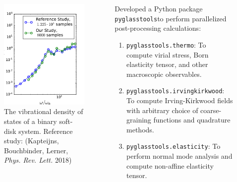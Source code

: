 \begin{frame}[c]
\begin{columns}[c]
\begin{column}{0.5\textwidth}
\begin{figure}
\begin{overprint}
\centering\includegraphics[height=0.7\textheight]{backup-simulationdetails/vdos_lerner.pdf}\caption{The vibrational density of states of a binary soft-disk system. Reference study: (Kapteijns, Bouchbinder, Lerner, \textit{Phys. Rev. Lett.} 2018)}
\end{overprint}
\end{figure}
\end{column} 

\begin{column}{0.5\textwidth}

Developed a Python package \texttt{pyglasstools}\footnotemark to perform parallelized post-processing calculations:
\begin{enumerate}
    \item<2-> \texttt{pyglasstools.thermo}: To compute  virial stress, Born elasticity tensor, and other macroscopic observables. 
    \item<3-> \texttt{pyglasstools.irvingkirkwood}: To compute Irving-Kirkwood fields with arbitrary choice of coarse-graining functions and quadrature methods.
    \item<4-> \texttt{pyglasstools.elasticity}: To perform normal mode analysis and compute non-affine elasticity tensor.
\end{enumerate}

\end{column}

\end{columns}
    
\end{frame}